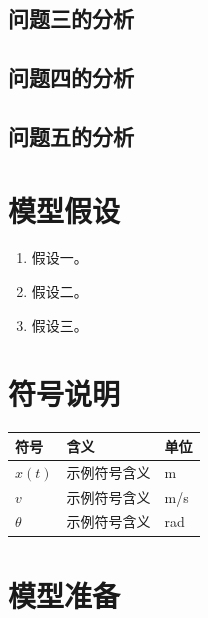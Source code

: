 \documentclass[12pt,a4paper]{ctexart}
\theoremstyle{definition}
\theoremstyle{plain}
\theoremstyle{remark}
\newenvironment{symboltable}
  {\begin{center}\zihao{5}\begin{tabular}{>{\centering\arraybackslash}p{3.5cm} p{7.5cm} >{\centering\arraybackslash}p{1.5cm}}
  \toprule
  \textbf{符号} & \textbf{含义} & \textbf{单位} \\
  \midrule}
  {\bottomrule\end{tabular}\end{center}}
\begin{document}
\subsection{问题三的分析}


\subsection{问题四的分析}


\subsection{问题五的分析}



\section{模型假设}

\begin{enumerate}[label=\arabic*.]
  \item 假设一。
  \item 假设二。
  \item 假设三。
\end{enumerate}


\section{符号说明}

\begin{symboltable}
$x(t)$ & 示例符号含义 & m \\
$v$ & 示例符号含义 & m/s \\
$\theta$ & 示例符号含义 & rad \\
\end{symboltable}


\section{模型准备}
\end{document}
